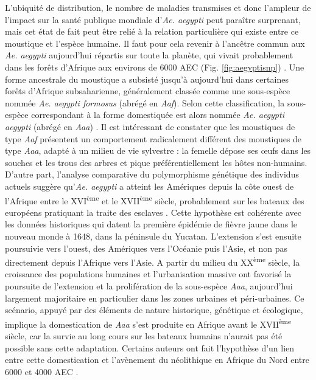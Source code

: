 L'ubiquité de distribution, le nombre de maladies transmises et donc l'ampleur de l'impact sur la santé publique mondiale d'{\em Ae. aegypti} peut paraître surprenant, mais cet état de fait peut être relié à la relation particulière qui existe entre ce moustique et l'espèce humaine.
Il faut pour cela revenir à l'ancêtre commun aux {\em Ae. aegypti} aujourd'hui répartis sur toute la planète, qui vivait probablement dans les forêts d'Afrique aux environs de 6000 AEC (Fig. \ref{fig:aegyptisnp}) \cite{brown2014human}.
Une forme ancestrale du moustique a subsisté jusqu'à aujourd'hui dans certaines forêts d'Afrique subsaharienne, généralement classée comme une sous-espèce nommée {\em Ae. aegypti formosus} (abrégé en {\em Aaf}). Selon cette classification, la sous-espèce correspondant à la forme domestiquée est alors nommée {\em Ae. aegypti aegypti} (abrégé en {\em Aaa}) \cite{powell2013history}.
Il est intéressant de constater que les moustiques de type {\em Aaf} présentent un comportement radicalement différent des moustiques de type {\em Aaa}, adapté à un milieu de vie sylvestre : la femelle dépose ses \oe ufs dans les souches et les trous des arbres et pique préférentiellement les hôtes non-humains.
D'autre part, l'analyse comparative du polymorphisme génétique des individus actuels suggère qu'{\em Ae. aegypti} a atteint les Amériques depuis la côte ouest de l'Afrique entre le XVI\textsuperscript{ème} et le XVII\textsuperscript{ème} siècle, probablement sur les bateaux des européens pratiquant la traite des esclaves \cite{bryant2007out}.
Cette hypothèse est cohérente avec les données historiques qui datent la première épidémie de fièvre jaune dans le nouveau monde à 1648, dans la péninsule du Yucatan.
L'extension s'est ensuite poursuivie vers l'ouest, des Amériques vers l'Océanie puis l'Asie, et non pas directement depuis l'Afrique vers l'Asie.
A partir du milieu du XX\textsuperscript{ème} siècle, la croissance des populations humaines et l'urbanisation massive ont favorisé la poursuite de l'extension et la prolifération de la sous-espèce {\em Aaa}, aujourd'hui largement majoritaire en particulier dans les zones urbaines et péri-urbaines.
Ce scénario, appuyé par des éléments de nature historique, génétique et écologique, implique la domestication de {\em Aaa} s'est produite en Afrique avant le XVII\textsuperscript{ème} siècle, car la survie au long cours sur les bateaux humains n'aurait pas été possible sans cette adaptation.
Certains auteurs ont fait l'hypothèse d'un lien entre cette domestication et l'avènement du néolithique en Afrique du Nord entre 6000 et 4000 AEC \cite{tabachnick1991evolutionary}.

